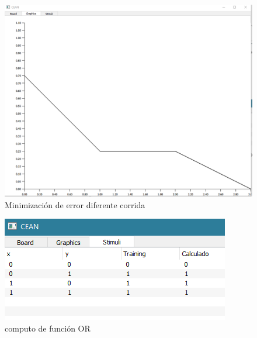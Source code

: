 \documentclass[]{article}
\begin{document}
\begin{figure}
	\centering
	\includegraphics[width=0.7\linewidth]{ore_error_2}
	\caption{Minimización de error diferente corrida}
	\label{fig:ore_error}
\end{figure}

\begin{figure}
\centering
\includegraphics[width=0.7\linewidth]{ore_salida}
\caption{computo de función OR}
\label{fig:ore_salida}
\end{figure}
\end{document}
